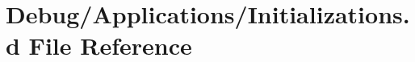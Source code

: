 \hypertarget{Initializations_8d}{}\section{Debug/\+Applications/\+Initializations.d File Reference}
\label{Initializations_8d}
